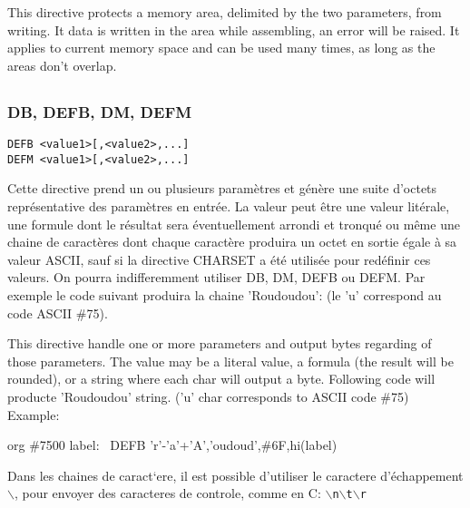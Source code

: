 \begin{xen}
This directive protects a memory area, delimited by the two parameters, from writing. It data is written in the area while assembling, an error will be raised.
It applies to current memory space and can be used many times, as long as the areas don't overlap.
\end{xen}

\subsection{}

\subsubsection{DB, DEFB, DM, DEFM}

\begin{verbatim}
DEFB <value1>[,<value2>,...]
DEFM <value1>[,<value2>,...]
\end{verbatim}

\begin{xfr}
Cette directive prend un ou plusieurs paramètres et génère une suite d'octets représentative des paramètres en entrée. La valeur peut être une valeur litérale, une formule dont le résultat sera éventuellement arrondi et tronqué ou même une chaine de caractères dont chaque caractère produira un octet en sortie égale à sa valeur ASCII, sauf si la directive CHARSET a été utilisée pour redéfinir ces valeurs. On pourra indifferemment utiliser DB, DM, DEFB ou DEFM.
Par exemple le code suivant produira la chaine 'Roudoudou': (le 'u' correspond au code ASCII \#75).
\end{xfr}

\begin{xen}
This directive handle one or more parameters and output bytes regarding of those parameters. The value may be a literal value, a formula (the result will be rounded), or a string where each char will output a byte.
Following code will producte 'Roudoudou' string. ('u' char corresponds to ASCII code \#75)
Example:
\end{xen}

\begin{code}
org \#7500
label:
\ DEFB 'r'-'a'+'A','oudoud',\#6F,hi(label)
\end{code}

\begin{xfr}
Dans les chaines de caract`ere, il est possible d'utiliser le caractere d'échappement $\backslash$, pour envoyer des caracteres de controle, comme en C: \texttt{$\backslash$n$\backslash$t$\backslash$r}
\end{xfr}

